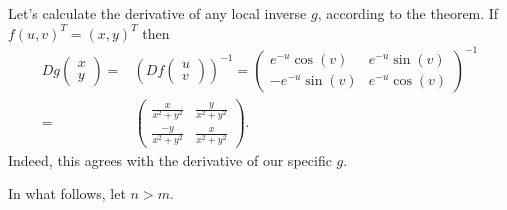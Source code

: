 \documentclass[12pt]{article}
\begin{document}
\begin{example}
	Let's calculate the derivative of any local inverse $g$, according to the theorem. If $f(u,v)^T=(x,y)^T$ then 
	\begin{align*}
		Dg\begin{pmatrix}x\\ y\end{pmatrix} 
		=& \left( Df\begin{pmatrix}u\\ v\end{pmatrix}\right)^{-1} = \begin{pmatrix} e^{-u}\cos(v) &  e^{-u}\sin(v) \\ -e^{-u}\sin(v) & e^{-u}\cos(v) \end{pmatrix}^{-1} \\
		=& \begin{pmatrix} \frac{x}{x^2+y^2} & \frac{y}{x^2+y^2} \\ \frac{-y}{x^2+y^2} & \frac{x}{x^2+y^2} \end{pmatrix}.
	\end{align*}
	Indeed, this agrees with the derivative of our specific $g$.
\end{example}

In what follows, let $n>m$.
\end{document}
